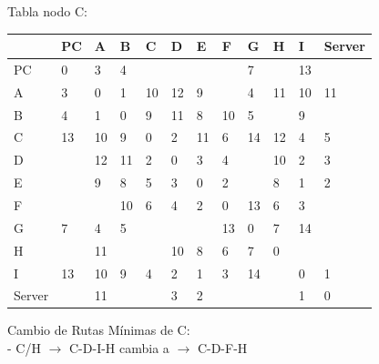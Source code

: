 \documentclass[a4paper]{article}
\begin{document}
\begin{table}[h]
Tabla nodo C:\\
\begin{tabular}{|l|l|l|l|l|l|l|l|l|l|l|l|}
\hline
       & PC & A  & B  & C  & D  & E  & F  & G  & H  & I  & Server \\ \hline
PC     & 0  & 3  & 4  &    &    &    &    & 7  &    & 13 &        \\ \hline
A      & 3  & 0  & 1  & 10 & 12 & 9  &    & 4  & 11 & 10 & 11     \\ \hline
B      & 4  & 1  & 0  & 9  & 11 & 8  & 10 & 5  &    & 9  &        \\ \hline
C      & 13 & 10 & 9  & 0  & 2  & 11 & 6  & 14 & 12 & 4  & 5      \\ \hline
D      &    & 12 & 11 & 2  & 0  & 3  & 4  &    & 10 & 2  & 3      \\ \hline
E      &    & 9  & 8  & 5  & 3  & 0  & 2  &    & 8  & 1  & 2      \\ \hline
F      &    &    & 10 & 6  & 4  & 2  & 0  & 13 & 6  & 3  &        \\ \hline
G      & 7  & 4  & 5  &    &    &    & 13 & 0  & 7  & 14 &        \\ \hline
H      &    & 11 &    &    & 10 & 8  & 6  & 7  & 0  &    &        \\ \hline
I      & 13 & 10 & 9  & 4  & 2  & 1  & 3  & 14 &    & 0  & 1      \\ \hline
Server &    & 11 &    &    & 3  & 2  &    &    &    & 1  & 0      \\ \hline
\end{tabular}

Cambio de Rutas Mínimas de C:\\
-	C/H  $\rightarrow$  C-D-I-H  cambia a  $\rightarrow$  C-D-F-H\\

\end{table}

\clearpage
\end{document}
